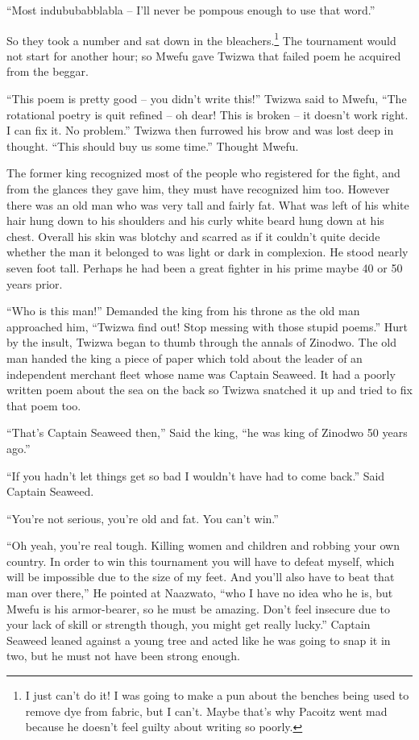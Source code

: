 ``Most indububabblabla -- I'll never be pompous enough to use that word.''

\tbreak

So they took a number and sat down in the bleachers.\footnote{I just can't do it! I was going to make a pun about the benches being used to remove dye from fabric, but I can't. Maybe that's why Pacoitz went mad because he doesn't feel guilty about writing so poorly.} The tournament would not start for another hour; so Mwefu gave Twizwa that failed poem he acquired from the beggar.

``This poem is pretty good -- you didn't write this!'' Twizwa said to Mwefu, ``The rotational poetry is quit refined -- oh dear! This is broken -- it doesn't work right. I can fix it. No problem.'' Twizwa then furrowed his brow and was lost deep in thought. ``This should buy us some time.'' Thought Mwefu.

The former king recognized most of the people who registered for the fight, and from the glances they gave him, they must have recognized him too. However there was an old man who was very tall and fairly fat. What was left of his white hair hung down to his shoulders and his curly white beard hung down at his chest. Overall his skin was blotchy and scarred as if it couldn't quite decide whether the man it belonged to was light or dark in complexion. He stood nearly seven foot tall. Perhaps he had been a great fighter in his prime maybe 40 or 50 years prior.

``Who is this man!'' Demanded the king from his throne as the old man approached him, ``Twizwa find out! Stop messing with those stupid poems.'' Hurt by the insult, Twizwa began to thumb through the annals of Zinodwo. The old man handed the king a piece of paper which told about the leader of an independent merchant fleet whose name was Captain Seaweed. It had a poorly written poem about the sea on the back so Twizwa snatched it up and tried to fix that poem too.

``That's Captain Seaweed then,'' Said the king, ``he was king of Zinodwo 50 years ago.''

``If you hadn't let things get so bad I wouldn't have had to come back.'' Said Captain Seaweed.

``You're not serious, you're old and fat. You can't win.''

``Oh yeah, you're real tough. Killing women and children and robbing your own country. In order to win this tournament you will have to defeat myself, which will be impossible due to the size of my feet. And you'll also have to beat that man over there,'' He pointed at Naazwato, ``who I have no idea who he is, but Mwefu is his armor-bearer, so he must be amazing. Don't feel insecure due to your lack of skill or strength though, you might get really lucky.'' Captain Seaweed leaned against a young tree and acted like he was going to snap it in two, but he must not have been strong enough.

